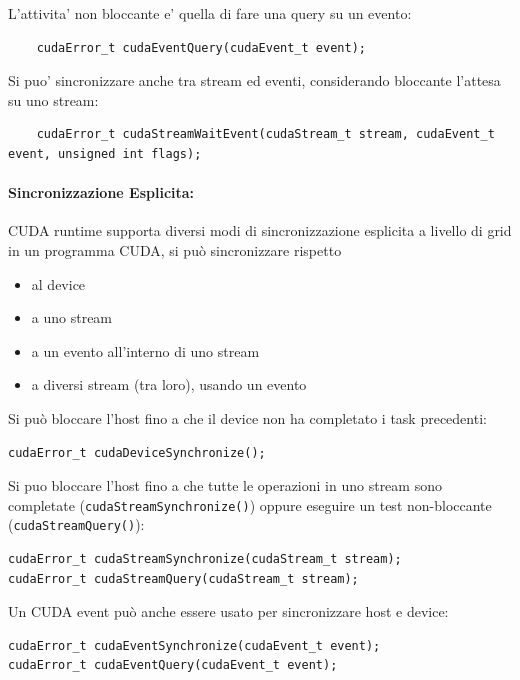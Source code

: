 L'attivita' non bloccante e' quella di fare una query su un evento:
\begin{lstlisting}
    cudaError_t cudaEventQuery(cudaEvent_t event);
\end{lstlisting}

Si puo' sincronizzare anche tra stream ed eventi, considerando bloccante l'attesa su uno stream:
\begin{lstlisting}
    cudaError_t cudaStreamWaitEvent(cudaStream_t stream, cudaEvent_t event, unsigned int flags);
\end{lstlisting}

\paragraph{Sincronizzazione Esplicita:} CUDA runtime supporta diversi modi di sincronizzazione esplicita a livello di grid in un programma CUDA, si può sincronizzare rispetto
\begin{itemize}
	\item al device
	
	\item a uno stream
	
	\item a un evento all'interno di uno stream
	
	\item a diversi stream (tra loro), usando un evento
\end{itemize}

Si può bloccare l'host fino a che il device non ha completato i task precedenti:
\begin{lstlisting}
cudaError_t cudaDeviceSynchronize();
\end{lstlisting}

Si puo bloccare l'host fino a che tutte le operazioni in uno stream sono completate (\texttt{cudaStreamSynchronize()}) oppure eseguire un test non-bloccante (\texttt{cudaStreamQuery()}):

\begin{lstlisting}
cudaError_t cudaStreamSynchronize(cudaStream_t stream);
cudaError_t cudaStreamQuery(cudaStream_t stream);
\end{lstlisting}

Un CUDA event può anche essere usato per sincronizzare host e device:
\begin{lstlisting}
cudaError_t cudaEventSynchronize(cudaEvent_t event);
cudaError_t cudaEventQuery(cudaEvent_t event);
\end{lstlisting}

